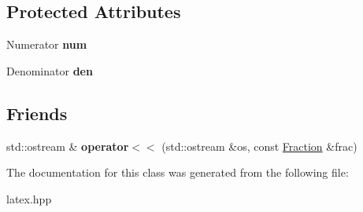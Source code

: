 \subsection*{Protected Attributes}
\begin{DoxyCompactItemize}
\item 
\hypertarget{classlatex_1_1math_1_1Fraction_aadb81c77d43201c6a063777b12f6d5ad}{Numerator {\bfseries num}}\label{classlatex_1_1math_1_1Fraction_aadb81c77d43201c6a063777b12f6d5ad}

\item 
\hypertarget{classlatex_1_1math_1_1Fraction_a73c046e3d1e82e0c1189f896cda0a3a9}{Denominator {\bfseries den}}\label{classlatex_1_1math_1_1Fraction_a73c046e3d1e82e0c1189f896cda0a3a9}

\end{DoxyCompactItemize}
\subsection*{Friends}
\begin{DoxyCompactItemize}
\item 
\hypertarget{classlatex_1_1math_1_1Fraction_a9313ed58249557fab9c0b6ab5e5f977f}{std\-::ostream \& {\bfseries operator$<$$<$} (std\-::ostream \&os, const \hyperlink{classlatex_1_1math_1_1Fraction}{Fraction} \&frac)}\label{classlatex_1_1math_1_1Fraction_a9313ed58249557fab9c0b6ab5e5f977f}

\end{DoxyCompactItemize}


The documentation for this class was generated from the following file\-:\begin{DoxyCompactItemize}
\item 
latex.\-hpp\end{DoxyCompactItemize}
